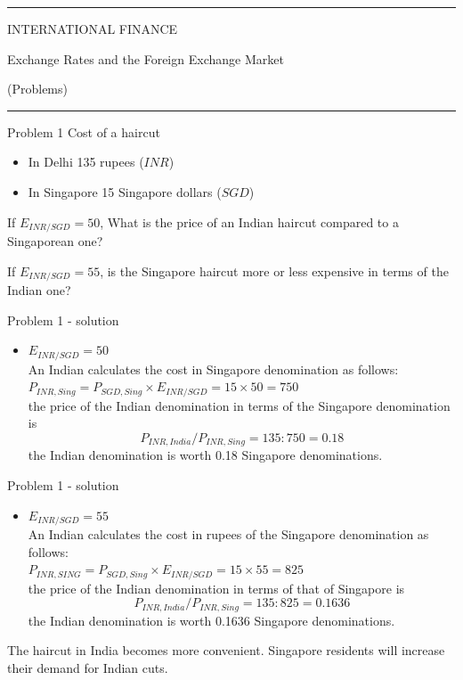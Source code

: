 \documentclass[12pt,aspectratio=169]{beamer}
\newif\ifshowsolution
\begin{document}
\begin{frame}

\begin{center}

\rule{\textwidth}{2pt}

\vskip3mm
INTERNATIONAL FINANCE

Exchange Rates and the Foreign Exchange Market

(Problems)
\rule{\textwidth}{2pt}

\end{center}

\end{frame}


\begin{frame}{Problem 1}
	Cost of a haircut
	\begin{itemize}
		\item In Delhi 135 rupees ($INR$)
		\item In Singapore 15 Singapore dollars ($SGD$)
	\end{itemize}

	If $E_{INR/SGD}=50$, What is the price of an Indian haircut compared to a Singaporean one?

	If $E_{INR/SGD}=55$, is the Singapore haircut more or less expensive in terms of the Indian one?

\end{frame}

\ifshowsolution
\begin{frame}{Problem 1 - solution}
			\begin{itemize}
				\item[]$E_{INR/SGD}=50$\\ An Indian calculates the cost in Singapore denomination as follows:\\ $P_{INR,Sing}=P_{SGD,Sing}\times E_{INR/SGD}=15\times50=750$\\ the price of the Indian denomination in terms of the Singapore denomination is \[P_{INR, India}/P_{INR,Sing}=135:750=0.18\] the Indian denomination is worth 0.18 Singapore denominations.
		\end{itemize}
\end{frame}
\begin{frame}{Problem 1 - solution}
			\begin{itemize}
				\item[]$E_{INR/SGD}=55$\\ An Indian calculates the cost in rupees of the Singapore denomination as follows:\\ $P_{INR,SING}=P_{SGD,Sing}\times E_{INR/SGD}=15\times55=825$\\ the price of the Indian denomination in terms of that of Singapore is \[P_{INR, India}/P_{INR,Sing}=135:825=0.1636\] the Indian denomination is worth 0.1636 Singapore denominations.
		\end{itemize}
		The haircut in India becomes more convenient. Singapore residents will increase their demand for Indian cuts.


\end{frame}
\end{document}
